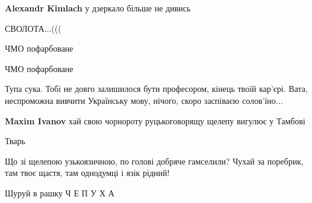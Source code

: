 \begin{itemize}
\begin{itemize}

\textbf{Alexandr Kimlach} у дзеркало більше не дивись
\end{itemize}


СВОЛОТА...(((


ЧМО пофарбоване


ЧМО пофарбоване


Тупа сука. Тобі не довго залишилося бути професором, кінець твоїй кар'єрі. Вата, неспроможна вивчити Українську мову, нічого, скоро заспіваєю солов'їно...

\begin{itemize}

\textbf{Maxim Ivanov} хай свою чорнороту руцькоговорящу щелепу вигулює у Тамбові
\end{itemize}


Тварь


Що зі щелепою узькоязичною, по голові добряче гамселили? Чухай за поребрик, там твоє щастя, там однодумці і язік рідний!


Шуруй в рашку Ч Е П У Х А


\end{itemize}
